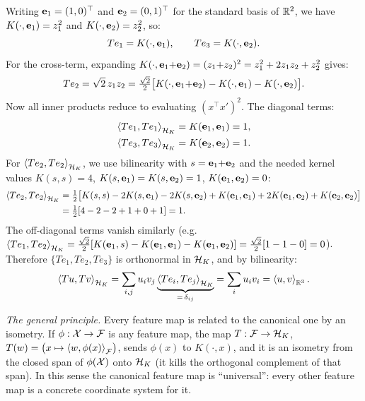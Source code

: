 \begin{notechapter}
\begin{intuition}
Writing $\mathbf{e}_1 = (1,0)^\top$ and
$\mathbf{e}_2 = (0,1)^\top$ for the standard basis of
$\mathbb{R}^2$, we have
$K(\cdot, \mathbf{e}_1) = z_1^2$ and
$K(\cdot, \mathbf{e}_2) = z_2^2$, so:
\[
Te_1 = K(\cdot, \mathbf{e}_1), \qquad
Te_3 = K(\cdot, \mathbf{e}_2).
\]
For the cross-term, expanding
$K(\cdot, \mathbf{e}_1{+}\mathbf{e}_2) = (z_1{+}z_2)^2
= z_1^2 + 2z_1 z_2 + z_2^2$ gives:
\[
Te_2 = \sqrt{2}\,z_1 z_2
= \tfrac{\sqrt{2}}{2}\bigl[
K(\cdot, \mathbf{e}_1{+}\mathbf{e}_2)
- K(\cdot, \mathbf{e}_1) - K(\cdot, \mathbf{e}_2)\bigr].
\]
Now all inner products reduce to evaluating
$(x^\top x')^2$. The diagonal terms:
\begin{align*}
\left\langle Te_1, Te_1 \right\rangle_{\mathcal{H}_K}
&= K(\mathbf{e}_1, \mathbf{e}_1) = 1, \\
\left\langle Te_3, Te_3 \right\rangle_{\mathcal{H}_K}
&= K(\mathbf{e}_2, \mathbf{e}_2) = 1.
\end{align*}
For $\left\langle Te_2, Te_2 \right\rangle_{\mathcal{H}_K}$, we use bilinearity
with $s = \mathbf{e}_1{+}\mathbf{e}_2$ and the needed
kernel values $K(s,s) = 4$,
$K(s,\mathbf{e}_1) = K(s,\mathbf{e}_2) = 1$,
$K(\mathbf{e}_1,\mathbf{e}_2) = 0$:
\begin{align*}
\left\langle Te_2, Te_2 \right\rangle_{\mathcal{H}_K}
&= \tfrac{1}{2}\bigl[
  K(s,s) - 2K(s,\mathbf{e}_1) - 2K(s,\mathbf{e}_2)
  + K(\mathbf{e}_1,\mathbf{e}_1)
  + 2K(\mathbf{e}_1,\mathbf{e}_2)
  + K(\mathbf{e}_2,\mathbf{e}_2)
\bigr] \\
&= \tfrac{1}{2}[4 - 2 - 2 + 1 + 0 + 1] = 1.
\end{align*}
The off-diagonal terms vanish similarly (e.g.\
$\left\langle Te_1, Te_2 \right\rangle_{\mathcal{H}_K}
= \frac{\sqrt{2}}{2}[K(\mathbf{e}_1, s)
- K(\mathbf{e}_1, \mathbf{e}_1)
- K(\mathbf{e}_1, \mathbf{e}_2)]
= \frac{\sqrt{2}}{2}[1 - 1 - 0] = 0$).
Therefore $\{Te_1, Te_2, Te_3\}$ is orthonormal in
$\mathcal{H}_K$, and by bilinearity:
\[
\inner{Tu}{Tv}_{\hk}
= \sum_{i,j} u_i v_j
  \underbrace{\inner{Te_i}{Te_j}_{\hk}}_{%
    =\,\delta_{ij}}
= \sum_i u_i v_i
= \inner{u}{v}_{\R^3}.
\]
\end{intuition}

\begin{intuition}
\emph{The general principle.} Every feature map is related to the canonical one by an isometry. If $\phi: \mathcal{X} \to \mathcal F$ is any feature map, the map $T: \mathcal F \to \mathcal{H}_K$, $T(w) = \bigl(x \mapsto \left\langle w, \phi(x) \right\rangle_{\mathcal F}\bigr)$, sends $\phi(x)$ to $K(\cdot, x)$, and it is an isometry from the closed span of $\phi(\mathcal{X})$ onto $\mathcal{H}_K$ (it kills the orthogonal complement of that span). In this sense the canonical feature map is ``universal'': every other feature map is a concrete coordinate system for it.


\end{intuition}
\end{notechapter}
